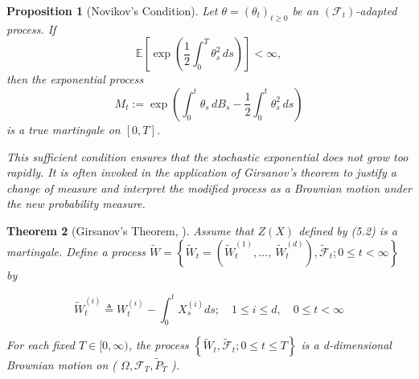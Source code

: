 \documentclass[11pt, twoside]{report}
\newtheorem{theorem}{Theorem}[section]
\newtheorem{proposition}[theorem]{Proposition}
\begin{document}
\begin{proposition}[Novikov’s Condition]
Let $\theta = (\theta_t)_{t \geq 0}$ be an $(\mathcal{F}_t)$-adapted process. If
\[
\mathbb{E} \left[ \exp\left( \frac{1}{2} \int_0^T \theta_s^2 \, ds \right) \right] < \infty,
\]
then the exponential process
\[
M_t := \exp\left( \int_0^t \theta_s \, dB_s - \frac{1}{2} \int_0^t \theta_s^2 \, ds \right)
\]
is a true martingale on $[0,T]$.

\medskip

This sufficient condition ensures that the stochastic exponential does not grow too rapidly. It is often invoked in the application of Girsanov's theorem to justify a change of measure and interpret the modified process as a Brownian motion under the new probability measure.
\end{proposition}
\begin{theorem}[Girsanov's Theorem, \texorpdfstring{\cite[Theorem~5.1]{Karatzas1991-xr}}{}]
Assume that $Z(X)$ defined by (5.2) is a martingale. Define a process $\tilde{W}=\left\{\tilde{W}_t=\left(\tilde{W}_t^{(1)}, \ldots\right.\right.$, $\left.\left.\tilde{W}_t^{(d)}\right), \tilde{\mathcal{F}}_t ; 0 \leq t<\infty\right\}$ by

$$
\tilde{W}_t^{(i)} \triangleq W_t^{(i)}-\int_0^t X_s^{(i)} d s ; \quad 1 \leq i \leq d, \quad 0 \leq t<\infty
$$


For each fixed $T \in[0, \infty)$, the process $\left\{\tilde{W}_t, \tilde{\mathcal{F}}_t ; 0 \leq t \leq T\right\}$ is a d-dimensional Brownian motion on ( $\Omega, \mathcal{F}_T, \widetilde{P}_T$ ).
\end{theorem}

\end{document}
